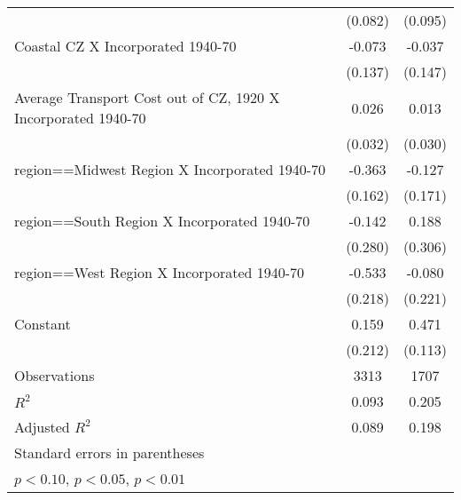 \begin{table}[htbp]
\begin{tabular}{l*{2}{c}}
                    &     (0.082)         &     (0.095)         \\
[1em]
Coastal CZ X Incorporated 1940-70&      -0.073         &      -0.037         \\
                    &     (0.137)         &     (0.147)         \\
[1em]
Average Transport Cost out of CZ, 1920 X Incorporated 1940-70&       0.026         &       0.013         \\
                    &     (0.032)         &     (0.030)         \\
[1em]
region==Midwest Region X Incorporated 1940-70&      -0.363\sym{**} &      -0.127         \\
                    &     (0.162)         &     (0.171)         \\
[1em]
region==South Region X Incorporated 1940-70&      -0.142         &       0.188         \\
                    &     (0.280)         &     (0.306)         \\
[1em]
region==West Region X Incorporated 1940-70&      -0.533\sym{**} &      -0.080         \\
                    &     (0.218)         &     (0.221)         \\
[1em]
Constant            &       0.159         &       0.471\sym{***}\\
                    &     (0.212)         &     (0.113)         \\
\hline
Observations        &        3313         &        1707         \\
\(R^{2}\)           &       0.093         &       0.205         \\
Adjusted \(R^{2}\)  &       0.089         &       0.198         \\
\hline\hline
\multicolumn{3}{l}{\footnotesize Standard errors in parentheses}\\
\multicolumn{3}{l}{\footnotesize \sym{*} \(p<0.10\), \sym{**} \(p<0.05\), \sym{***} \(p<0.01\)}\\
\end{tabular}
\end{table}
